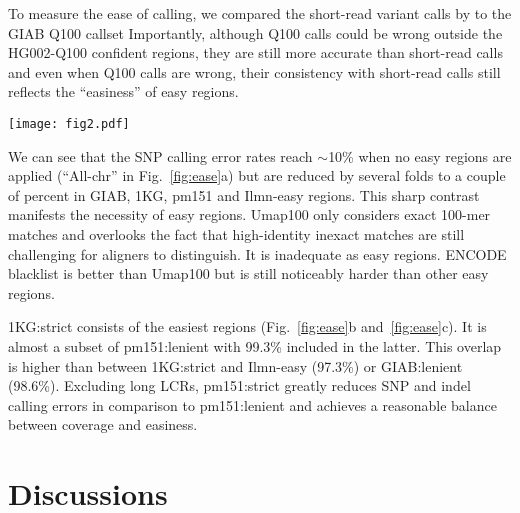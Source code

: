 \documentclass[webpdf,contemporary,large,namedate]{oup-authoring-template}%
\begin{document}
To measure the ease of calling, we compared the short-read variant calls by \citet{Baid2020.12.11.422022} to the GIAB Q100 callset
Importantly, although Q100 calls could be wrong outside the HG002-Q100 confident regions,
they are still more accurate than short-read calls
and even when Q100 calls are wrong, their consistency with short-read calls
still reflects the ``easiness'' of easy regions.

\begin{figure*}[tb]
\texttt{[image: fig2.pdf]}
\caption{Small variant calling accuracy in easy and confident regions.
{\bf (a)} SNP accuracy.
DeepVariant, Strelka2, Octopus and GATK short-read variant calls from 30X NovaSeq data were obtained from \citet{Baid2020.12.11.422022}.
Pipelup calls were made with ``{\tt minipileup -ys3 -a1 -p.25}''.
False discovery rate (FDR) and false negative rate (FNR) were calculated by RTG vcfeval~\citep{Cleary023754}
with genotype errors ignored.
``All-chr'' represents all chromosomal sequences in GRCh38 without easy regions.
{\bf (b)} SNP accuracy in high-quality easy regions.
{\bf (c)} Indel accuracy in high-quality easy regions.
Pileup indel calls are omitted due to their high error rates.
}\label{fig:ease}
\end{figure*}

We can see that the SNP calling error rates reach $\sim$10\% when no easy regions are applied (``All-chr'' in Fig.~\ref{fig:ease}a)
but are reduced by several folds to a couple of percent in GIAB, 1KG, pm151 and Ilmn-easy regions.
This sharp contrast manifests the necessity of easy regions.
Umap100 only considers exact 100-mer matches and overlooks the fact that high-identity inexact matches
are still challenging for aligners to distinguish.
It is inadequate as easy regions.
ENCODE blacklist is better than Umap100 but is still noticeably harder than other easy regions.

1KG:strict consists of the easiest regions (Fig.~\ref{fig:ease}b and~\ref{fig:ease}c).
It is almost a subset of pm151:lenient with 99.3\% included in the latter.
This overlap is higher than between 1KG:strict and Ilmn-easy (97.3\%) or GIAB:lenient (98.6\%).
Excluding long LCRs,
pm151:strict greatly reduces SNP and indel calling errors in comparison to pm151:lenient
and achieves a reasonable balance between coverage and easiness.

\section{Discussions}
\end{document}
